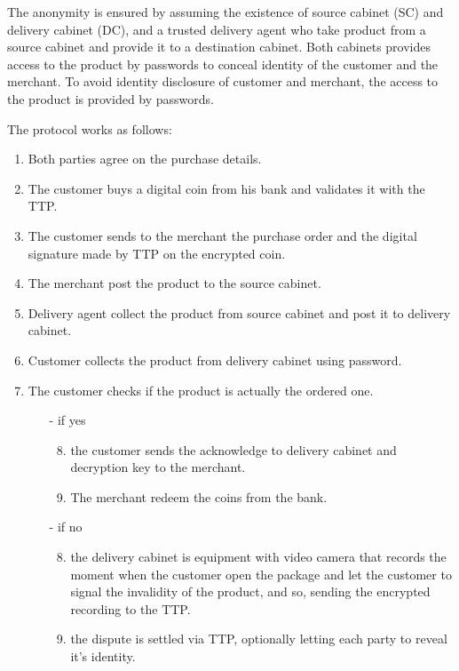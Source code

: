 \documentclass{ieeeaccess}
\begin{document}
The anonymity is ensured by assuming the existence of source cabinet
(SC) and delivery cabinet (DC), and a trusted delivery agent who take
product from a source cabinet and provide it to a destination cabinet.
Both cabinets provides access to the product by passwords to conceal
identity of the customer and the merchant. To avoid identity disclosure
of customer and merchant, the access to the product is provided by
passwords.

The protocol works as follows: \begingroup
\renewcommand{\labelenumii}{\arabic{enumii}.}

\begin{enumerate}
    \item Both parties agree on the purchase details.
    \item The customer buys a digital coin from his bank and validates it with the TTP.
    \item The customer sends to the merchant the purchase order and the digital signature made by TTP on the encrypted coin.
    \item The merchant post the product to the source cabinet.
    \item Delivery agent collect the product from source cabinet and post it to delivery cabinet.
    \item Customer collects the product from delivery cabinet using password.
    \item The customer checks if the product is actually the ordered one.
    \begin{itemize}
    \item[-] if yes 
        \begin{enumerate}
        \setcounter{enumii}{7}
        \item the customer sends the acknowledge to delivery cabinet and decryption key to the merchant.
        \item The merchant redeem the coins from the bank.
        \end{enumerate}
    \item[-] if no
        \begin{enumerate}
        \setcounter{enumii}{7}
        \item the delivery cabinet is equipment with video camera that records the moment when the customer open the package and let the customer to signal the invalidity of the product, and so, sending the encrypted recording to the TTP. 
        \item the dispute is settled via TTP, optionally letting each party to reveal it's identity.
    \end{enumerate}
    \end{itemize}
\end{enumerate}
\endgroup
\end{document}
